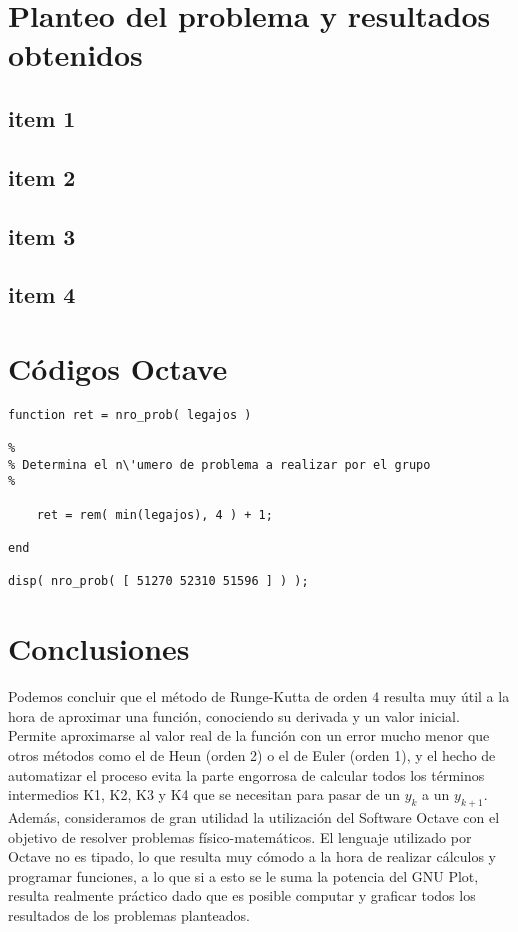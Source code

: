 \documentclass{article}
\begin{document}
 \section{Planteo del problema y resultados obtenidos}
 
 \subsection{item 1}
 \subsection{item 2}
 \subsection{item 3}
 \subsection{item 4}
 
 \newpage
 \section{C\'odigos Octave}
 \begin{lstlisting}[frame=tblr,breaklines=true]
function ret = nro_prob( legajos )

%
% Determina el n\'umero de problema a realizar por el grupo
%

    ret = rem( min(legajos), 4 ) + 1;

end

disp( nro_prob( [ 51270 52310 51596 ] ) );

\end{lstlisting}
\newpage
\section{Conclusiones}

Podemos concluir que el m\'etodo de Runge-Kutta de orden 4 resulta muy \'util a la hora de aproximar una funci\'on, conociendo su derivada y un valor inicial. Permite aproximarse al valor real de la funci\'on con un error mucho menor que otros m\'etodos como el de Heun (orden 2) o el de Euler (orden 1), y el hecho de automatizar el proceso evita la parte engorrosa de calcular todos los t\'erminos intermedios K1, K2, K3 y K4 que se necesitan para pasar de un  $y_k$ a un $y_{k+1}$.\\

Adem\'as, consideramos de gran utilidad  la utilizaci\'on del Software Octave con el objetivo de resolver problemas f\'isico-matem\'aticos. El lenguaje utilizado por Octave no es tipado, lo que resulta muy c\'omodo a la hora de realizar c\'alculos y programar funciones, a lo que si a esto se le suma la potencia del GNU Plot, resulta realmente pr\'actico dado que es posible computar y graficar todos los resultados de los problemas planteados.\\
\end{document}
